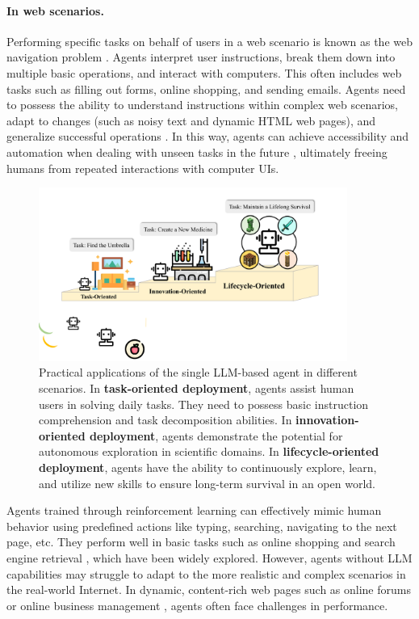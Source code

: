 \paragraph{In web scenarios.}
Performing specific tasks on behalf of users in a web scenario is known as the web navigation problem \cite{DBLP:journals/corr/abs-2305-11854}. Agents interpret user instructions, break them down into multiple basic operations, and interact with computers. This often includes web tasks such as filling out forms, online shopping, and sending emails. Agents need to possess the ability to understand instructions within complex web scenarios, adapt to changes (such as noisy text and dynamic HTML web pages), and generalize successful operations \cite{DBLP:journals/corr/abs-2307-13854}. In this way, agents can achieve accessibility and automation when dealing with unseen tasks in the future \cite{DBLP:conf/naacl/XuMDCHLL21}, ultimately freeing humans from repeated interactions with computer UIs.

\begin{figure}[t]
    \centering
    \includegraphics[width=0.9\textwidth]{figures/sec4_single2.pdf}
    \caption{Practical applications of the single LLM-based agent in different scenarios. In \textbf{task-oriented deployment}, agents assist human users in solving daily tasks. They need to possess basic instruction comprehension and task decomposition abilities. In \textbf{innovation-oriented deployment}, agents demonstrate the potential for autonomous exploration in scientific domains. In \textbf{lifecycle-oriented deployment}, agents have the ability to continuously explore, learn, and utilize new skills to ensure long-term survival in an open world.}
    \label{fig: sec4_single_agent}
\end{figure} 

Agents trained through reinforcement learning can effectively mimic human behavior using predefined actions like typing, searching, navigating to the next page, etc. They perform well in basic tasks such as online shopping \cite{DBLP:conf/nips/Yao0YN22} and search engine retrieval \cite{DBLP:journals/corr/abs-2112-09332}, which have been widely explored. However, agents without LLM capabilities may struggle to adapt to the more realistic and complex scenarios in the real-world Internet. In dynamic, content-rich web pages such as online forums or online business management \cite{DBLP:journals/corr/abs-2307-13854}, agents often face challenges in performance.

